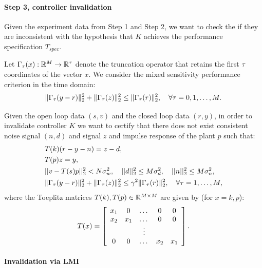 \documentclass[11pt, onecolumn]{article}
\begin{document}
\paragraph{Step 3, controller invalidation}
Given the experiment data from Step 1 and Step 2, we want to check the if they are inconsistent with
the hypothesis that $K$ achieves the performance specification $T_{spec}$.

Let $\Gamma_{\tau}(x):\mathbb R^{M}\to \mathbb R^{\tau}$ denote the truncation operator that retains the first $\tau$
coordinates of the vector $x$. We consider the mixed sensitivity performance criterion in the time
domain:
\begin{align*}
  \|\Gamma_{\tau}(y-r)\|_2^2 + \|\Gamma_{\tau}(z)\|_2^2 \le \|\Gamma_{\tau}(r)\|_2^2, \quad \forall \tau = 0,1,\dots, M.
\end{align*}

Given the open loop data $(s,v)$ and the closed loop data $(r,y)$, in order to  invalidate controller
$K$ we want to certify that there does not exist consistent noise signal $(n,d)$ and signal $z$ and
impulse response of the plant $p$ such that:
\begin{align}
  & T(k) (r-y - n) = z-d,
  \label{eq:linear-k}
  \\
  & T(p) z = y,
  \label{eq:quad-p}
  \\
  & ||v - T(s)p||_2^2 < N \sigma_w^2, \quad ||d||_2^2\leq M \sigma_d^2 , \quad ||n||_2^2\leq M
  \sigma_n^2,
  \label{eq:noise-bound}
  \\
  & \|\Gamma_{\tau}(y-r)\|_2^2 + \|\Gamma_{\tau}(z)\|_2^2 \le \gamma^2 \|\Gamma_{\tau}(r)\|_2^2, \quad \forall
  \tau = 1,\dots, M,
  \label{eq:perf-spec}
\end{align}
where the Toeplitz matrices $T(k), T(p)\in\mathbb R^{M\times M}$  are given by (for $x=k,p$):
\begin{align}
  \label{eq:Tk-Tp}
  T(x) = \left[
    \begin{array}[c]{ccccc}
      x_1 & 0 &\dots & 0  & 0
      \\
      x_2 & x_1 & \dots  & 0  & 0
      \\
      & & \vdots & &
      \\
      0  & 0  & \dots & x_2 & x_1
    \end{array}
\right].
\end{align}


\paragraph{Invalidation via LMI}
\end{document}
